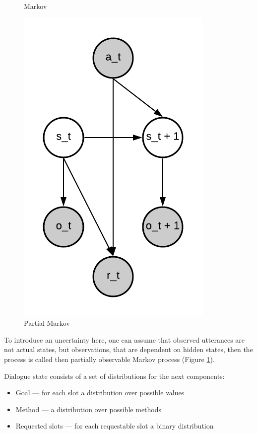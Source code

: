 \documentclass[12pt,titlepage,a4paper]{article}
\begin{document}
\begin{figure}[!htb]
      \caption{Markov}
      \label{Markov}
    \endminipage\hfill
      \includegraphics[width=\linewidth]{partial-markov.png}
      \caption{Partial Markov}
      \label{PartialMarkov}
    \endminipage
\end{figure}

To introduce an uncertainty here, one can assume that observed utteran\-ces are not actual states, but observations, that are dependent on hidden states, then the process is called then partially observable Markov process (Figure \ref{PartialMarkov}).

Dialogue state consists of a set of distributions for the next components: 
\begin{itemize}
    \item Goal --- for each slot a distribution over possible values
    \item Method --- a distribution over possible methods
    \item Requested slots --- for each requestable slot a binary distribution
\end{itemize}
\end{document}
